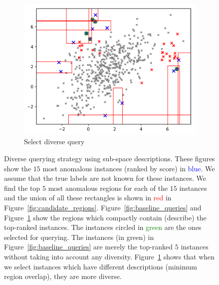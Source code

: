 \documentclass{article} %
\begin{document}
\begin{figure}
	\begin{subfigure}[b]{0.48\textwidth}
		\includegraphics[width=\textwidth]{query_compact_ntop5_100_trees_aad}
		\caption{Select diverse query}
		\label{fig:diverse_queries}
	\end{subfigure}
	\caption{Diverse querying strategy using sub-space descriptions. These figures show the $15$ most anomalous instances (ranked by score) in \textcolor{blue}{blue}. We assume that the true labels are not known for these instances. We find the top $5$ most anomalous regions for each of the $15$ instances and the union of all these rectangles is shown in \textcolor{red}{red} in Figure~\ref{fig:candidate_regions}. Figure~\ref{fig:baseline_queries} and Figure~\ref{fig:diverse_queries} show the regions which compactly contain (describe) the top-ranked instances. The instances circled in \textcolor{green}{green} are the ones selected for querying. The instances (in green) in Figure~\ref{fig:baseline_queries} are merely the top-ranked $5$ instances without taking into account any diversity. Figure~\ref{fig:diverse_queries} shows that when we select instances which have different descriptions (minimum region overlap), they are more diverse.} \label{fig:diverse}
\end{figure}
\end{document}
